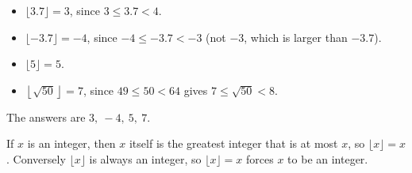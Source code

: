 \begin{itemize}
\item $\lfloor3.7\rfloor=3$, since $3\le3.7<4$.
\item $\lfloor-3.7\rfloor=-4$, since $-4\le-3.7<-3$ (not $-3$, which is larger than $-3.7$).
\item $\lfloor5\rfloor=5$.
\item $\left\lfloor\sqrt{50}\right\rfloor=7$, since $49\le50<64$ gives $7\le\sqrt{50}<8$.
\end{itemize}
The answers are $\boxed{3,\ -4,\ 5,\ 7}$.

If $x$ is an integer, then $x$ itself is the greatest integer that is at most $x$, so $\lfloor x\rfloor=x$. Conversely $\lfloor x\rfloor$ is always an integer, so $\lfloor x\rfloor=x$ forces $x$ to be an integer.
